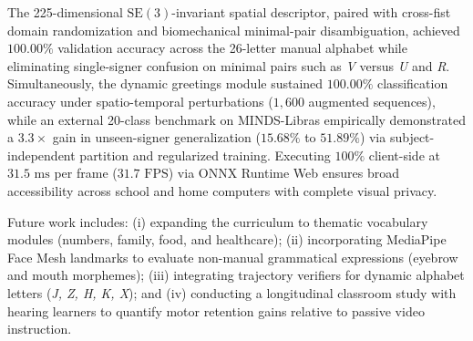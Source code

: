 \documentclass[12pt,a4paper]{article}
\begin{document}
The 225-dimensional $\text{SE}(3)$-invariant spatial descriptor, paired with cross-fist domain randomization and biomechanical minimal-pair disambiguation, achieved $100.00\%$ validation accuracy across the 26-letter manual alphabet while eliminating single-signer confusion on minimal pairs such as \textit{V} versus \textit{U} and \textit{R}. Simultaneously, the dynamic greetings module sustained $100.00\%$ classification accuracy under spatio-temporal perturbations ($1{,}600$ augmented sequences), while an external 20-class benchmark on MINDS-Libras empirically demonstrated a $3.3\times$ gain in unseen-signer generalization ($15.68\%$ to $51.89\%$) via subject-independent partition and regularized training. Executing $100\%$ client-side at $31.5\text{ ms}$ per frame ($31.7\text{ FPS}$) via ONNX Runtime Web ensures broad accessibility across school and home computers with complete visual privacy.

Future work includes: (i) expanding the curriculum to thematic vocabulary modules (numbers, family, food, and healthcare); (ii) incorporating MediaPipe Face Mesh landmarks to evaluate non-manual grammatical expressions (eyebrow and mouth morphemes); (iii) integrating trajectory verifiers for dynamic alphabet letters (\textit{J, Z, H, K, X}); and (iv) conducting a longitudinal classroom study with hearing learners to quantify motor retention gains relative to passive video instruction.




\end{document}
